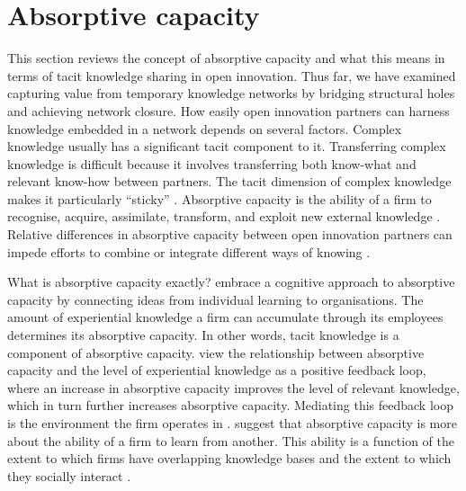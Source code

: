 \section{Absorptive capacity} \label{sec:absorptive}

This section reviews the concept of absorptive capacity and what this means in terms of tacit knowledge sharing in open innovation. Thus far, we have examined capturing value from temporary knowledge networks by bridging structural holes and achieving network closure. How easily open innovation partners can harness knowledge embedded in a network depends on several factors. Complex knowledge usually has a significant tacit component to it. Transferring complex knowledge is difficult because it involves transferring both know-what and relevant know-how between partners. The tacit dimension of complex knowledge makes it particularly \enquote{sticky} \citep{von1994sticky,szulanski2003sticky}. Absorptive capacity is the ability of a firm to recognise, acquire, assimilate, transform, and exploit new external knowledge \citep{cohen1990absorptive}. Relative differences in absorptive capacity between open innovation partners can impede efforts to combine or integrate different ways of knowing \citep{vanhaverbeke2007connecting,lichtenthaler2016absorptive}. \medskip

What is absorptive capacity exactly? \citet{cohen1990absorptive} embrace a cognitive approach to absorptive capacity by connecting ideas from individual learning to organisations. The amount of experiential knowledge a firm can accumulate through its employees determines its absorptive capacity. In other words, tacit knowledge is a component of absorptive capacity. \citet{cohen1990absorptive} view the relationship between absorptive capacity and the level of experiential knowledge as a positive feedback loop, where an increase in absorptive capacity improves the level of relevant knowledge, which in turn further increases absorptive capacity. Mediating this feedback loop is the environment the firm operates in \citep{van1999coevolution}. \citet{lane1998relative} suggest that absorptive capacity is more about the ability of a firm to learn from another. This ability is a function of the extent to which firms have overlapping knowledge bases and the extent to which they socially interact \citep{dyer1998relational,nooteboom2000learning}. \medskip

